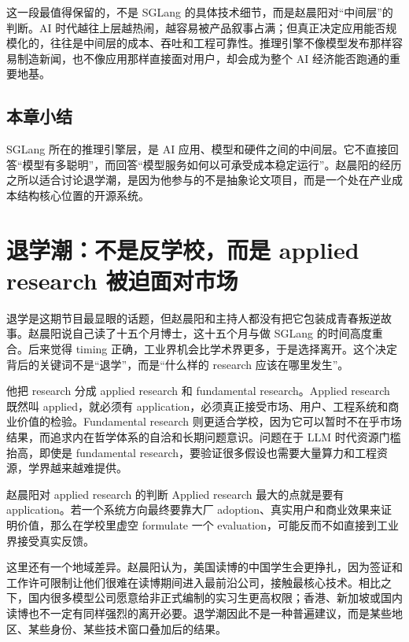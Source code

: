 \documentclass[a4paper]{article}
\begin{document}
这一段最值得保留的，不是 SGLang 的具体技术细节，而是赵晨阳对“中间层”的判断。AI 时代越往上层越热闹，越容易被产品叙事占满；但真正决定应用能否规模化的，往往是中间层的成本、吞吐和工程可靠性。推理引擎不像模型发布那样容易制造新闻，也不像应用那样直接面对用户，却会成为整个 AI 经济能否跑通的重要地基。

\subsection{本章小结}

SGLang 所在的推理引擎层，是 AI 应用、模型和硬件之间的中间层。它不直接回答“模型有多聪明”，而回答“模型服务如何以可承受成本稳定运行”。赵晨阳的经历之所以适合讨论退学潮，是因为他参与的不是抽象论文项目，而是一个处在产业成本结构核心位置的开源系统。

\section{退学潮：不是反学校，而是 applied research 被迫面对市场}

退学是这期节目最显眼的话题，但赵晨阳和主持人都没有把它包装成青春叛逆故事。赵晨阳说自己读了十五个月博士，这十五个月与做 SGLang 的时间高度重合。后来觉得 timing 正确，工业界机会比学术界更多，于是选择离开。这个决定背后的关键词不是“退学”，而是“什么样的 research 应该在哪里发生”。

他把 research 分成 applied research 和 fundamental research。Applied research 既然叫 applied，就必须有 application，必须真正接受市场、用户、工程系统和商业价值的检验。Fundamental research 则更适合学校，因为它可以暂时不在乎市场结果，而追求内在哲学体系的自洽和长期问题意识。问题在于 LLM 时代资源门槛抬高，即使是 fundamental research，要验证很多假设也需要大量算力和工程资源，学界越来越难提供。

\begin{importantbox}{赵晨阳对 applied research 的判断}
Applied research 最大的点就是要有 application。若一个系统方向最终要靠大厂 adoption、真实用户和商业效果来证明价值，那么在学校里虚空 formulate 一个 evaluation，可能反而不如直接到工业界接受真实反馈。
\end{importantbox}

这里还有一个地域差异。赵晨阳认为，美国读博的中国学生会更挣扎，因为签证和工作许可限制让他们很难在读博期间进入最前沿公司，接触最核心技术。相比之下，国内很多模型公司愿意给非正式编制的实习生更高权限；香港、新加坡或国内读博也不一定有同样强烈的离开必要。退学潮因此不是一种普遍建议，而是某些地区、某些身份、某些技术窗口叠加后的结果。
\end{document}
